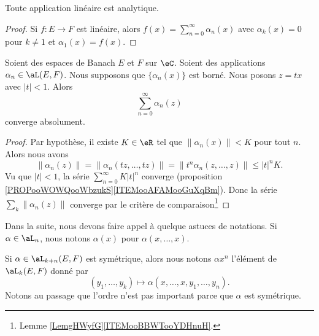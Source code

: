 \begin{proposition}	\label{PROPooMGWOooTeCDRk}
	Toute application linéaire est analytique.
\end{proposition}

\begin{proof}
	Si \(f \colon E\to F  \) est linéaire, alors \( f(x)=\sum_{n=0}^{\infty}\alpha_n(x)\) avec \( \alpha_k(x)=0\) pour \( k\neq 1\) et \( \alpha_1(x)=f(x)\).
\end{proof}

\begin{theorem}	\label{THOooNBNFooMsAorH}
	Soient des espaces de Banach \( E\) et \( F\) sur \( \eC\). Soient des applications \( \alpha_n\in\aL(E,F)\). Nous supposons que \( \{ \alpha_n(x) \}\) est borné. Nous posons \( z=tx\) avec \( | t |<1\). Alors
	\begin{equation}
		\sum_{n=0}^{\infty}\alpha_n(z)
	\end{equation}
	converge absolument.
\end{theorem}

\begin{proof}
	Par hypothèse, il existe \( K\in\eR\) tel que \( \| \alpha_n(x) \|<K\) pour tout \( n\). Alors nous avons
	\begin{equation}
		\| \alpha_n(z) \|=\| \alpha_n(tz,\ldots,tz) \|=\| t^n\alpha_n(z,\ldots,z) \|\leq | t |^nK.
	\end{equation}
	Vu que \( | t |<1\), la série \( \sum_{n=0}^{\infty}K| t |^n\) converge (proposition \ref{PROPooWOWQooWbzukS}\ref{ITEMooAFAMooGuXqBm}). Donc la série \( \sum_k\| \alpha_n(z) \|\) converge par le critère de comparaison\footnote{Lemme \ref{LemgHWyfG}\ref{ITEMooBBWTooYDHnuH}.}
\end{proof}

\begin{normaltext}		\label{NORMooQDCKooXHtrHQ}
	Dans la suite, nous devons faire appel à quelque astuces de notations. Si \( \alpha\in\aL_n\), nous notons \( \alpha(x)\) pour \( \alpha(x,\ldots,x)\).

	Si \( \alpha\in \aL_{k+n}(E,F)\) est symétrique, alors nous notons \( \alpha x^n\) l'élément de \(\aL_k(E,F) \) donné par
	\begin{equation}
		(y_1,\ldots,y_k)\mapsto \alpha(x,\ldots,x,y_1,\ldots,y_n).
	\end{equation}
	Notons au passage que l'ordre n'est pas important parce que \( \alpha\) est symétrique.
\end{normaltext}


